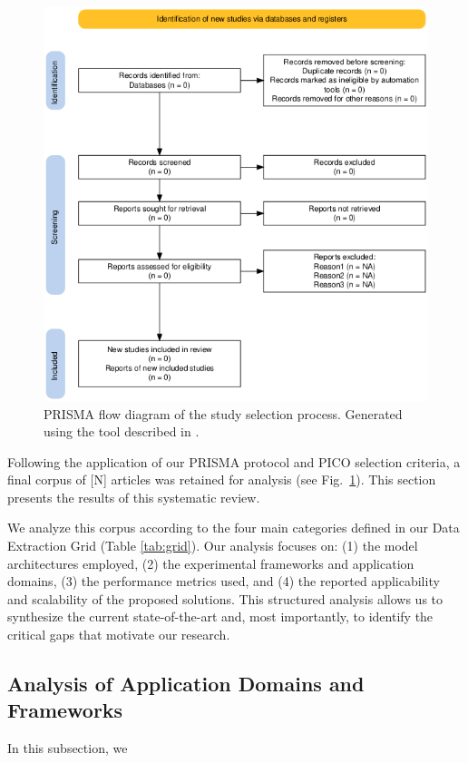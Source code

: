 \documentclass[conference]{IEEEtran}
\begin{document}
\begin{figure}[htbp]
\centerline{\includegraphics[width=\columnwidth]{prisma_flow.png}}
\caption{PRISMA flow diagram of the study selection process. Generated using the tool described in \cite{haddawayPRISMA2020PackageShiny2022}.}
\label{fig:prisma}
\end{figure}

Following the application of our PRISMA protocol and PICO selection criteria, a final corpus of [N] articles was retained for analysis (see Fig.~\ref{fig:prisma}). This section presents the results of this systematic review. 

We analyze this corpus according to the four main categories defined in our Data Extraction Grid (Table \ref{tab:grid}). Our analysis focuses on: (1) the model architectures employed, (2) the experimental frameworks and application domains, (3) the performance metrics used, and (4) the reported applicability and scalability of the proposed solutions. This structured analysis allows us to synthesize the current state-of-the-art and, most importantly, to identify the critical gaps that motivate our research.

\subsection{Analysis of Application Domains and Frameworks}
In this subsection, we 
\end{document}
